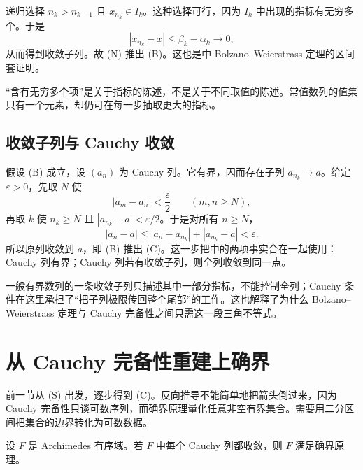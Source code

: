递归选择 \(n_k>n_{k-1}\) 且 \(x_{n_k}\in I_k\)。这种选择可行，因为 \(I_k\) 中出现的指标有无穷多个。于是
\[
 |x_{n_k}-x|\le\beta_k-\alpha_k\longrightarrow0,
\]
从而得到收敛子列。故 (N) 推出 (B)。这也是中 Bolzano--Weierstrass 定理的区间套证明。

“含有无穷多个项”是关于指标的陈述，不是关于不同取值的陈述。常值数列的值集只有一个元素，却仍可在每一步抽取更大的指标。

\subsection{收敛子列与 Cauchy 收敛}

假设 (B) 成立，设 \((a_n)\) 为 Cauchy 列。它有界，因而存在子列 \(a_{n_k}\to a\)。给定 \(\varepsilon>0\)，先取 \(N\) 使
\[
 |a_m-a_n|<\frac{\varepsilon}{2}\qquad(m,n\ge N),
\]
再取 \(k\) 使 \(n_k\ge N\) 且 \(|a_{n_k}-a|<\varepsilon/2\)。于是对所有 \(n\ge N\)，
\[
 |a_n-a|
 \le |a_n-a_{n_k}|+|a_{n_k}-a|
 <\varepsilon.
\]
所以原列收敛到 \(a\)，即 (B) 推出 (C)。这一步把中的两项事实合在一起使用：Cauchy 列有界；Cauchy 列若有收敛子列，则全列收敛到同一点。

一般有界数列的一条收敛子列只描述其中一部分指标，不能控制全列；Cauchy 条件在这里承担了“把子列极限传回整个尾部”的工作。这也解释了为什么 Bolzano--Weierstrass 定理与 Cauchy 完备性之间只需这一段三角不等式。

\section{从 Cauchy 完备性重建上确界}

前一节从 (S) 出发，逐步得到 (C)。反向推导不能简单地把箭头倒过来，因为 Cauchy 完备性只谈可数序列，而确界原理量化任意非空有界集合。需要用二分区间把集合的边界转化为可数数据。

\begin{theorem}
设 \(F\) 是 Archimedes 有序域。若 \(F\) 中每个 Cauchy 列都收敛，则 \(F\) 满足确界原理。
\end{theorem}

